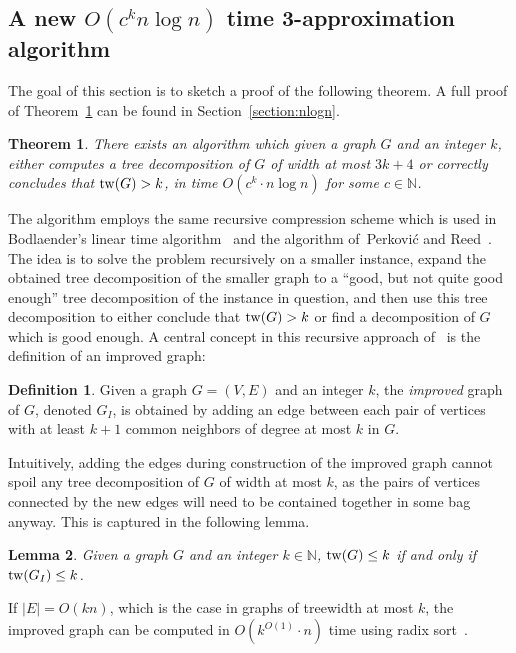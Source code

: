 \documentclass[a4paper,11pt]{article}
\newtheorem{theorem}{Theorem}
\newtheorem{lemma}{Lemma}[section]
\theoremstyle{definition}
\newtheorem{definition}[lemma]{Definition}
\theoremstyle{remark}
\begin{document}
\subsection{A new $O(c^kn \log n)$ time 3-approximation
  algorithm}\label{sec:recursiveScheme}
The goal of this section is to sketch a proof of the following
theorem.  A full proof of Theorem~\ref{theorem:nlogn} can be found in
Section~\ref{section:nlogn}.
\begin{theorem}
  \label{theorem:nlogn}
  There exists an algorithm which given a graph $G$ and an integer
  $k$, either computes a tree decomposition of $G$ of width at most
  $3k + 4$ or correctly concludes that $\mathrm{tw}(G) > k$, in time
  $O(c^k\cdot n \log n)$ for some $c \in \mathbb{N}$.
\end{theorem}

The algorithm employs the same recursive compression scheme which is
used in Bodlaender's linear time
algorithm~\cite{Bodlaender93s,Bodlaender96} and the algorithm
of~Perkovi{\'{c}} and Reed~\cite{PerkovicR00}.  The idea is to solve
the problem recursively on a smaller instance, expand the obtained
tree decomposition of the smaller graph to a ``good, but not quite
good enough'' tree decomposition of the instance in question, and then
use this tree decomposition to either conclude that $\mathrm{tw}(G) > k$ or
find a decomposition of $G$ which is good enough.  A central concept
in this recursive approach of~\cite{Bodlaender96} is the definition of
an improved graph:


\begin{definition}\label{def:prelim:improved-graph}
  Given a graph $G=(V,E)$ and an integer $k$, the \emph{improved}
  graph of $G$, denoted $G_I$, is obtained by adding an edge between
  each pair of vertices with at least $k+1$ common neighbors of degree
  at most $k$ in $G$.
\end{definition}

Intuitively, adding the edges during construction of the improved
graph cannot spoil any tree decomposition of $G$ of width at most $k$,
as the pairs of vertices connected by the new edges will need to be
contained together in some bag anyway.  This is captured in the
following lemma.

\begin{lemma}
  \label{lem:improvedGraphTw}
  Given a graph $G$ and an integer $k \in \mathbb{N}$, $\mathrm{tw}(G) \leq k$ if
  and only if $\mathrm{tw}(G_I) \leq k$.
\end{lemma}

If $|E|=O(kn)$, which is the case in graphs of treewidth at most $k$,
the improved graph can be computed in $O(k^{O(1)}\cdot n)$ time using
radix sort~\cite{Bodlaender96}.
\end{document}
